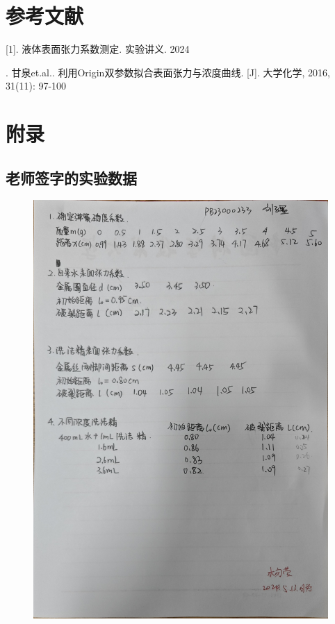 \documentclass[a4paper]{extarticle}
\begin{document}
    \section*{参考文献}
    [1]. 液体表面张力系数测定. 实验讲义. 2024\par
    [2]. 甘泉et.al.. 利用Origin双参数拟合表面张力与浓度曲线. [J]. 大学化学, 2016, 31(11): 97-100
    \newpage
    \section*{附录}
    \subsection*{老师签字的实验数据}
    \begin{figure}[H]
        \centering
        \includegraphics[width=\linewidth]{shuju.jpg}
    \end{figure}
\end{document}
